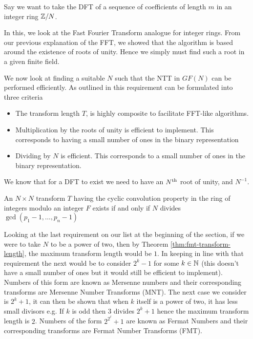 Say we want to take the DFT of a sequence of coefficients of length $m$ in an integer ring ${\mathbb Z}/N$.

In this, we look at the Fast Fourier Transform analogue for integer rings. From our previous explanation of the FFT, we showed that the algorithm is based around the existence of roots of unity. Hence we simply must find such a root in a given finite field.

We now look at finding a suitable $N$ such that the NTT in $GF(N)$ can be performed efficiently. As outlined in \cite{intro-to-fmt} this requirement can be formulated into three criteria
\begin{itemize}
\item The transform length $T$, is highly composite to facilitate FFT-like algorithms.
\item Multiplication by the roots of unity is efficient to implement. This corresponds to having a small number of ones in the binary representation
\item Dividing by $N$ is efficient. This corresponds to a small number of ones in the binary representation.
\end{itemize}

We know that for a DFT to exist we need to have an $N^{\textrm{th}}$ root of unity, and $N^{-1}$. 

\begin{theorem}\label{thm:fmt-transform-length}
    An $N \times N$ transform $T$ having the cyclic convolution property in the ring of integers modulo an integer $F$ exists if and only if $N$ divides $\gcd(p_1 - 1, \ldots, p_n - 1)$
\end{theorem}

Looking at the last requirement on our list at the beginning of the section, if we were to take $N$ to be a power of two, then by Theorem \ref{thm:fmt-transform-length}, the maximum transform length would be $1$. In keeping in line with that requirement the next would be to consider $2^k - 1$  for some $k \in {\mathbb N}$ (this doesn't have a small number of ones but it would still be efficient to implement). Numbers of this form are known as Mersenne numbers and their corresponding transforms are Mersenne Number Transforms (MNT). The next case we consider is $2^k + 1$, it can then be shown that when $k$ itself is a power of two, it has less small divisors e.g. If $k$ is odd then $3$ divides $2^k + 1$ hence the maximum transform length is $2$. Numbers of the form $2^{2^\ell} + 1$ are known as Fermat Numbers and their corresponding transforms are Fermat Number Transforms (FMT).

